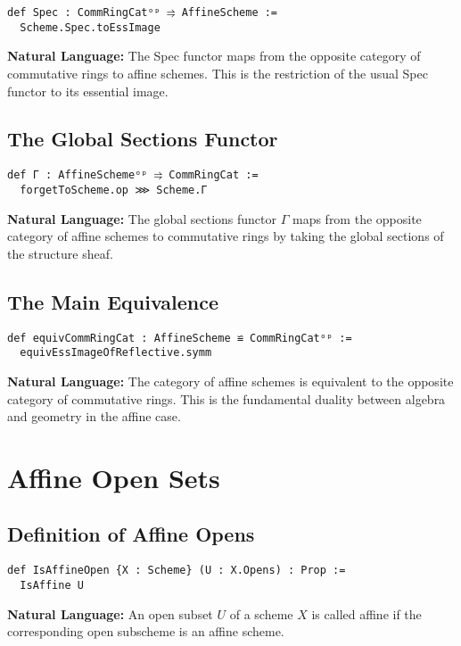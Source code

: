\documentclass{article}
\theoremstyle{definition}
\begin{document}
\begin{lstlisting}
def Spec : CommRingCatᵒᵖ ⥤ AffineScheme :=
  Scheme.Spec.toEssImage
\end{lstlisting}

\textbf{Natural Language:} The Spec functor maps from the opposite category of commutative rings to affine schemes. This is the restriction of the usual Spec functor to its essential image.

\subsection{The Global Sections Functor}

\begin{lstlisting}
def Γ : AffineSchemeᵒᵖ ⥤ CommRingCat :=
  forgetToScheme.op ⋙ Scheme.Γ
\end{lstlisting}

\textbf{Natural Language:} The global sections functor $\Gamma$ maps from the opposite category of affine schemes to commutative rings by taking the global sections of the structure sheaf.

\subsection{The Main Equivalence}

\begin{lstlisting}
def equivCommRingCat : AffineScheme ≌ CommRingCatᵒᵖ :=
  equivEssImageOfReflective.symm
\end{lstlisting}

\textbf{Natural Language:} The category of affine schemes is equivalent to the opposite category of commutative rings. This is the fundamental duality between algebra and geometry in the affine case.

\section{Affine Open Sets}

\subsection{Definition of Affine Opens}

\begin{lstlisting}
def IsAffineOpen {X : Scheme} (U : X.Opens) : Prop :=
  IsAffine U
\end{lstlisting}

\textbf{Natural Language:} An open subset $U$ of a scheme $X$ is called affine if the corresponding open subscheme is an affine scheme.
\end{document}
